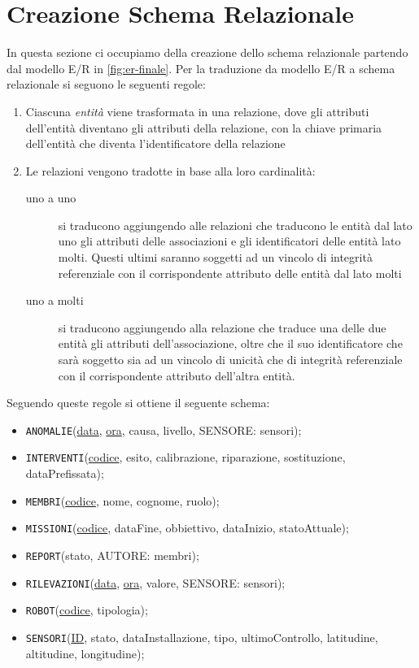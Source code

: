 \section{Creazione Schema Relazionale}
In questa sezione ci occupiamo della creazione dello schema relazionale partendo dal
modello E/R in \ref{fig:er-finale}. Per la traduzione da modello E/R a schema relazionale
si seguono le seguenti regole:
\begin{enumerate}
\item Ciascuna \textit{entità} viene trasformata in una relazione,
  dove gli attributi dell'entità diventano gli attributi della
  relazione, con la chiave primaria dell'entità che diventa
  l'identificatore della relazione
\item Le relazioni vengono tradotte in base alla loro cardinalità:
  \begin{description}
  \item[uno a uno] si traducono aggiungendo alle relazioni che traducono le entità dal lato uno gli
    attributi delle associazioni e gli identificatori delle entità lato molti. Questi ultimi saranno soggetti
    ad un vincolo di integrità referenziale con il corrispondente attributo delle entità dal lato molti
  \item[uno a molti] si traducono aggiungendo alla relazione che traduce una delle due entità gli attributi
    dell’associazione, oltre che il suo identificatore che sarà soggetto sia ad un vincolo di unicità
    che di integrità referenziale con il corrispondente attributo dell’altra entità.
  \end{description}
\end{enumerate}

Seguendo queste regole si ottiene il seguente schema:
\begin{itemize}
\item \texttt{ANOMALIE}(\underline{data}, \underline{ora}, causa, livello, SENSORE: sensori);
\item \texttt{INTERVENTI}(\underline{codice}, esito, calibrazione, riparazione, sostituzione, dataPrefissata);
\item \texttt{MEMBRI}(\underline{codice}, nome, cognome, ruolo);
\item \texttt{MISSIONI}(\underline{codice}, dataFine, obbiettivo, dataInizio, statoAttuale);
\item \texttt{REPORT}(stato, AUTORE: membri);
\item \texttt{RILEVAZIONI}(\underline{data}, \underline{ora}, valore, SENSORE: sensori);
\item \texttt{ROBOT}(\underline{codice}, tipologia);
\item \texttt{SENSORI}(\underline{ID}, stato, dataInstallazione, tipo, ultimoControllo, latitudine, altitudine, longitudine);
\end{itemize}

